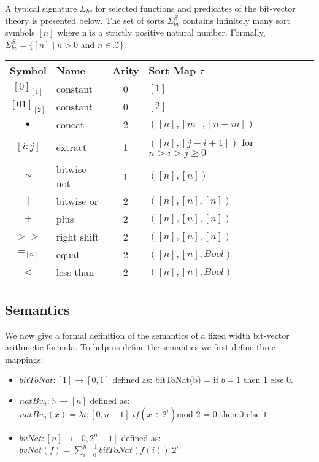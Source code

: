 A typical signature $\Sigma_{bv}$ for selected functions and predicates of the bit-vector theory is presented below. The set of sorts $\Sigma_{bv}^S$ contains
infinitely many sort symbols $[n]$ where n is a strictly positive natural number. Formally, $\Sigma_{bv}^S = \{[n] \mid n > 0 $ and $ n \in \mathcal{Z}\}$.
\begin{table}
\begin{tabular}{c | l | c | l }
Symbol & Name & Arity & Sort Map $\tau$  \\
\hline \hline
$[0]_{[1]}$ & constant & 0 & $[1]$  \\
$[01]_{[2]}$ & constant & 0 & $[2]$  \\ 
$\mathop{\bullet}$ & concat & 2 & $([n],[m],[n+m])$ \\
$[i:j]$ & extract & 1 & $([n],[j-i+1])$ for $n > i > j \ge 0$
 \\ 
$\sim$ & bitwise not & 1 & $([n],[n])$  \\
$\mid$ & bitwise or & 2 & $([n],[n],[n])$ \\
$+$ & plus & 2 & $([n],[n],[n])$ \\
$>>$ & right shift & 2 & $([n],[n],[n])$\\
$=_{[n]}$ & equal & 2 & $([n],[n],Bool)$  \\
$<$ & less than & 2 & $([n],[n],Bool)$ \\

\end{tabular}
\end{table}

\subsection{Semantics}

We now give a formal definition of the semantics of a fixed width bit-vector arithmetic formula. To help us define the semantics we first define three mappings:
\begin{itemize}
\item $bitToNat:[1] \rightarrow [0,1]$ defined as:
bitToNat(b) = if $b = 1$ then $1$ else $0$.
\item $natBv_n : \mathbb{N} \rightarrow [n]$ defined as: \\
$natBv_n(x) = \lambda i : [0, n-1].if (x \div 2^i ) $mod $2$ = $0$ then $0$ else $1$
\item $bvNat : [n]\rightarrow[0, 2^n-1]$ defined as: 
$bvNat(f) = \sum^{n-1}_{i=0} bitToNat(f(i)).2^i$
\end{itemize}

